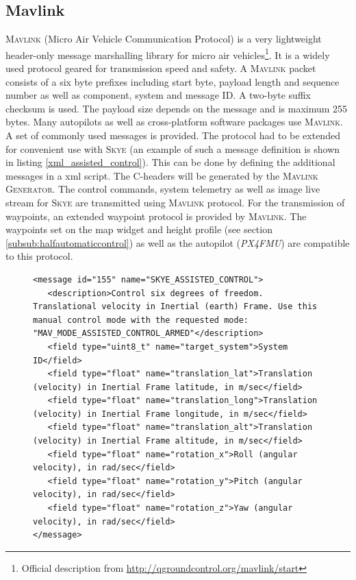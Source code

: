 \subsection{Mavlink}
\label{subsec:mavlink}
\textsc{Mavlink} (Micro Air Vehicle Communication Protocol) is a very lightweight header-only message marshalling library for micro air vehicles\footnote{Official description from \url{http://qgroundcontrol.org/mavlink/start}}. It is a widely used protocol geared for transmission speed and safety. A \textsc{Mavlink} packet consists of a six byte prefixes including start byte, payload length and sequence number as well as component, system and message ID. A two-byte suffix checksum is used. The payload size depends on the message and is maximum 255 bytes. Many autopilots as well as cross-platform software packages use \textsc{Mavlink}.
A set of commonly used messages is provided. The protocol had to be extended for convenient use with \textsc{Skye} (an example
 of such a message definition is shown in listing \ref{xml_assisted_control}). This can be done by defining the additional messages in a xml script. The C-headers will be generated by the \textsc{Mavlink Generator}. The control commands, system telemetry as well as image live stream for \textsc{Skye} are transmitted using \textsc{Mavlink} protocol. For the transmission of waypoints, an extended waypoint protocol is provided by \textsc{Mavlink}. The waypoints set on the map widget and height profile (see section \ref{subsub:halfautomaticcontrol}) as well as the autopilot (\textit{PX4FMU}) are compatible to this protocol.

\begin{figure}
\begin{lstlisting}[captionpos=b, caption=Sequence of skye.xml: Definition of the \textit{assisted control} command \textsc{Mavlink} message. It consists of six 32 bit floating numbers for the input values and a 8-bit integer to indicate the target system ID (the GUI could actually be connected to more than one UAV at the same time)., label=xml_assisted_control]
<message id="155" name="SKYE_ASSISTED_CONTROL">
   <description>Control six degrees of freedom. Translational velocity in Inertial (earth) Frame. Use this manual control mode with the requested mode: 
"MAV_MODE_ASSISTED_CONTROL_ARMED"</description>
   <field type="uint8_t" name="target_system">System ID</field>
   <field type="float" name="translation_lat">Translation (velocity) in Inertial Frame latitude, in m/sec</field>
   <field type="float" name="translation_long">Translation (velocity) in Inertial Frame longitude, in m/sec</field>
   <field type="float" name="translation_alt">Translation (velocity) in Inertial Frame altitude, in m/sec</field>
   <field type="float" name="rotation_x">Roll (angular velocity), in rad/sec</field>
   <field type="float" name="rotation_y">Pitch (angular velocity), in rad/sec</field>
   <field type="float" name="rotation_z">Yaw (angular velocity), in rad/sec</field>
</message>
\end{lstlisting}
\end{figure}
